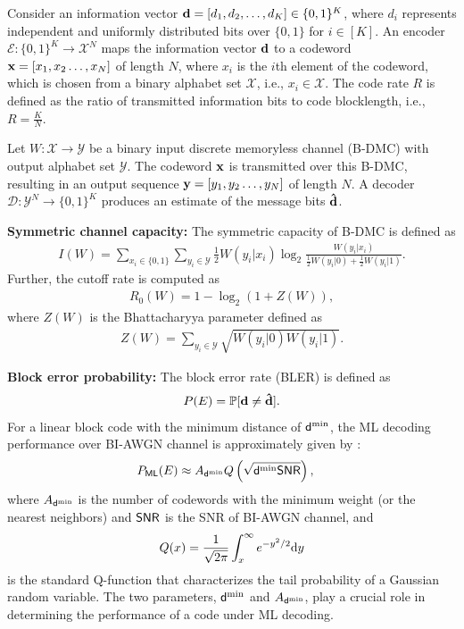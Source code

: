\documentclass[conference]{IEEEtran}
\begin{document}
Consider an information vector ${\bf d}=[d_1,d_2,\ldots, d_K]\in \{0,1\}^K$, where $d_i$ represents independent and uniformly distributed bits over $\{0,1\}$ for $i\in [K]$. An encoder $\mathcal{E}:\{0,1\}^K\rightarrow \mathcal{X}^N$ maps the information vector ${\bf d}$ to a codeword ${\bf x} =[x_1,x_2\ldots, x_N]$ of length $N$, where $x_i$ is the $i$th element of the codeword, which is chosen from a binary alphabet set $\mathcal{X}$, i.e., $x_i\in \mathcal{X}$. The code rate $R$ is defined as the ratio of transmitted information bits to code blocklength, i.e., $R=\frac{K}{N}$.

Let $W: \mathcal{X}\rightarrow \mathcal{Y}$ be a binary input discrete memoryless channel (B-DMC) with output alphabet set $\mathcal{Y}$. The codeword ${\bf x}$ is transmitted over this B-DMC, resulting in an output sequence ${\bf y}=[y_1,y_2\ldots, y_N]$ of length $N$. A decoder $\mathcal{D}:\mathcal{Y}^N\rightarrow \{0,1\}^K$ produces an estimate of the message bits ${\bf \hat d}$. 

{\bf Symmetric channel capacity:}
 The symmetric capacity of B-DMC is defined as
\begin{align}
	I(W)=\sum_{x_i\in \{0,1\}}\sum_{y_i\in \mathcal{Y}}\frac{1}{2}W(y_i|x_i)\log_2\frac{W(y_i|x_i)}{\frac{1}{2}W(y_i|0)+\frac{1}{2}W(y_i|1)}. \nonumber
\end{align}
Further, the cutoff rate is computed as
\begin{align}
	R_0(W)=1-\log_2\left(1+ Z(W)\right),
\end{align}
where $Z(W)$ is the Bhattacharyya parameter defined as
\begin{align}
	Z(W)=\sum_{y_i\in \mathcal{Y}} \sqrt{W(y_i|0)W(y_i|1)}.
\end{align}

{\bf Block error probability:}
The block error rate (BLER) is defined as
\begin{align}
	 P(E) =\mathbb{P}[ {\bf d}\neq {\bf \hat d}].
\end{align}
For a linear block code with the minimum distance of ${\sf d}^{\rm min}$, the ML decoding performance over BI-AWGN channel is approximately given by \cite{costello-road2capacity}:
\begin{align}
    P_{\sf ML}(E) &\approx A_{ {\sf d}^{ \rm  min}} Q\left(\sqrt{ {\sf d}^{ \rm  min} {\sf SNR}}\right),
\end{align}
where $A_{ {\sf d}^{\rm min}} $ is the number of codewords with the minimum weight (or the nearest neighbors) and ${\sf  SNR}$ is the SNR of BI-AWGN channel, and
\begin{align}
    Q(x) = \frac{1}{\sqrt {2\pi}} \int_x^\infty e^{-y^2/2}{\rm d}y
\end{align}
is the standard Q-function that characterizes the tail probability of a Gaussian random variable. The two parameters, ${\sf d}^{ \rm  min}$ and $A_{{\sf d}^{\rm min}}$,  play a crucial role in determining the performance of a code under  ML decoding. 
\end{document}

